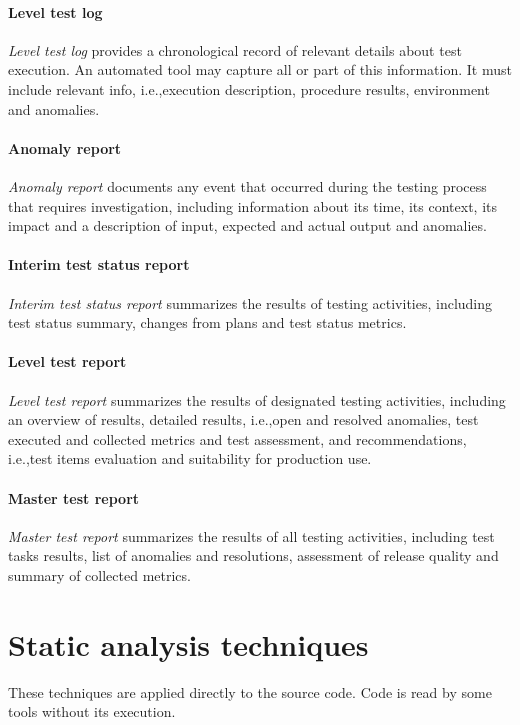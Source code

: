 \paragraph{Level test log}
\emph{Level test log} provides a chronological record of relevant details about test execution. An automated tool may capture all or part of this information. It must include relevant info, i.e.,\@ execution description, procedure results, environment and anomalies.

\paragraph{Anomaly report}
\emph{Anomaly report} documents any event that occurred during the testing process that requires investigation, including information about its time, its context, its impact and a description of input, expected and actual output and anomalies.

\paragraph{Interim test status report}
\emph{Interim test status report} summarizes the results of testing activities, including test status summary, changes from plans and test status metrics.

\paragraph{Level test report}
\emph{Level test report} summarizes the results of designated testing activities, including an overview of results, detailed results, i.e.,\@ open and resolved anomalies, test executed and collected metrics and test assessment, and recommendations, i.e.,\@ test items evaluation and suitability for production use.

\paragraph{Master test report}
\emph{Master test report} summarizes the results of all testing activities, including test tasks results, list of anomalies and resolutions, assessment of release quality and summary of collected metrics.

\section{Static analysis techniques}
These techniques are applied directly to the source code. Code is read by some tools without its execution.

